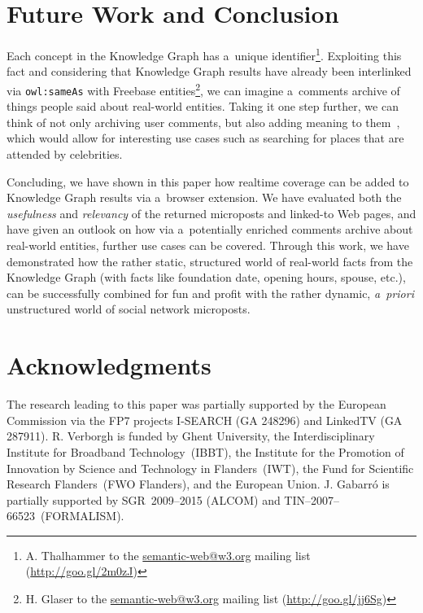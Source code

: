 \documentclass[runningheads,a4paper]{llncs}
\begin{document}

\section{Future Work and Conclusion}
Each concept in the Knowledge Graph has a~unique identifier\footnote{A. Thalhammer to the \url{semantic-web@w3.org} mailing list (\url{http://goo.gl/2m0zJ})}.
Exploiting this fact and considering that Knowledge Graph results
have already been interlinked via \texttt{owl:sameAs}
with Freebase entities\footnote{H. Glaser to the \url{semantic-web@w3.org} mailing list (\url{http://goo.gl/jj6Sg})},
we can imagine a~comments archive of things people said about real-world entities.
Taking it one step further, we can think of not only archiving user comments,
but also adding meaning to them~\cite{steiner2013},
which would allow for interesting use cases
such as searching for places that are attended by celebrities.

Concluding, we have shown in this paper how realtime coverage
can be added to Knowledge Graph results via a~browser extension.
We have evaluated both the \emph{usefulness} and \emph{relevancy}
of the returned microposts and linked-to Web pages,
and have given an outlook on how via a~potentially enriched comments archive
about real-world entities, further use cases can be covered.
Through this work, we have demonstrated how the rather static, structured world
of real-world facts from the Knowledge Graph
(with facts like foundation date, opening hours, spouse, etc.),
can be successfully combined for fun and profit
with the rather dynamic, \emph{a~priori} unstructured world
of social network microposts.


\section*{Acknowledgments}
\small
The research leading to this paper was partially supported by the European Commission via the FP7 projects \mbox{I-SEARCH} (GA 248296) and LinkedTV (GA 287911).
R. Verborgh is funded by Ghent University,
the Interdisciplinary Institute for Broadband Technology~(\mbox{IBBT}),
the Institute for the Promotion of Innovation by Science and Technology in Flanders~(\mbox{IWT}),
the Fund for Scientific Research Flanders~(\mbox{FWO} Flanders), and the European Union.
J. Gabarr\'o is partially supported by \mbox{SGR}~2009--2015 (\mbox{ALCOM}) and
\mbox{TIN}--2007--66523~(\mbox{FORMALISM}).


\end{document}
